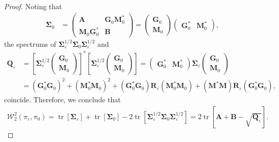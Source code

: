 \documentclass[10pt,a4paper]{amsart}
\renewcommand{\c}[1]{\mathcal{#1}}
\newcommand{\m}[1]{\mathbf{#1}}
\DeclareMathOperator{\tr}{tr}
\begin{document}
\begin{proof}
Noting that
\begin{align*}
    \m{\Sigma}_{0} &= \left(
    \begin{array}{c|c}
    \m{A} & \m{G}_{0} \m{M}_{0}^{*} \\
    \hline
    \m{M}_{0} \m{G}_{0}^{*} & \m{B}
    \end{array}
    \right) = \left(
    \begin{array}{c}
    \m{G}_{0} \\
    \hline
    \m{M}_{0}
    \end{array}
    \right) \left(
    \begin{array}{c|c}
    \m{G}_{0}^{*} & \m{M}_{0}^{*}
    \end{array}
    \right),
\end{align*}
the spectrums of $\m{\Sigma}_{\varepsilon}^{1/2} \m{\Sigma}_{0} \m{\Sigma}_{\varepsilon}^{1/2}$ and
\begin{align*}
    \m{Q}_{\varepsilon} &= \left[\m{\Sigma}_{\varepsilon}^{1/2} \left(
    \begin{array}{c}
    \m{G}_{0} \\
    \hline
    \m{M}_{0}
    \end{array}
    \right) \right]^{*} \left[\m{\Sigma}_{\varepsilon}^{1/2} \left(
    \begin{array}{c}
    \m{G}_{0} \\
    \hline
    \m{M}_{0}
    \end{array}
    \right) \right] = \left(
    \begin{array}{c|c}
    \m{G}_{0}^{*} & \m{M}_{0}^{*}
    \end{array}
    \right) \m{\Sigma}_{\varepsilon} \left(
    \begin{array}{c}
    \m{G}_{0} \\
    \hline
    \m{M}_{0}
    \end{array}
    \right) \\
    &= (\m{G}_{0}^{*} \m{G}_{0})^{2} + (\m{M}_{0}^{*} \m{M}_{0})^{2} + (\m{G}_{0}^{*} \m{G}_{0}) \m{R}_{\varepsilon} (\m{M}_{0}^{*} \m{M}_{0}) + (\m{M}^{*} \m{M}) \m{R}_{\varepsilon} (\m{G}_{0}^{*} \m{G}_{0}),
\end{align*}
coincide. Therefore, we conclude that
\begin{align*}
    \c{W}_{2}^{2}(\pi_{\varepsilon}, \pi_{0}) = \tr[\m{\Sigma}_{\varepsilon}] + \tr[\m{\Sigma}_{0}] - 2 \tr [\m{\Sigma}_{\varepsilon}^{1/2} \m{\Sigma}_{0} \m{\Sigma}_{\varepsilon}^{1/2}] = 2 \tr [\m{A} + \m{B}- \sqrt{\m{Q}_{\varepsilon}}].
\end{align*}
\end{proof}
\end{document}
